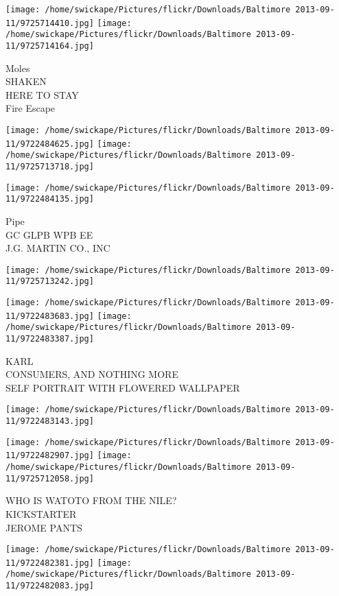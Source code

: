\documentclass[10pt,letterpaper]{article}
\begin{document}
\texttt{[image: /home/swickape/Pictures/flickr/Downloads/Baltimore 2013-09-11/9725714410.jpg]}
\texttt{[image: /home/swickape/Pictures/flickr/Downloads/Baltimore 2013-09-11/9725714164.jpg]}

Moles\\
SHAKEN\\
HERE TO STAY\\
Fire Escape
\pagebreak

\texttt{[image: /home/swickape/Pictures/flickr/Downloads/Baltimore 2013-09-11/9722484625.jpg]}
\texttt{[image: /home/swickape/Pictures/flickr/Downloads/Baltimore 2013-09-11/9725713718.jpg]}

\vspace{0.25in}
\texttt{[image: /home/swickape/Pictures/flickr/Downloads/Baltimore 2013-09-11/9722484135.jpg]}

Pipe\\
GC GLPB WPB EE\\
J.G. MARTIN CO., INC
\pagebreak

\texttt{[image: /home/swickape/Pictures/flickr/Downloads/Baltimore 2013-09-11/9725713242.jpg]}

\vspace{0.25in}
\texttt{[image: /home/swickape/Pictures/flickr/Downloads/Baltimore 2013-09-11/9722483683.jpg]}
\texttt{[image: /home/swickape/Pictures/flickr/Downloads/Baltimore 2013-09-11/9722483387.jpg]}

KARL\\
CONSUMERS, AND NOTHING MORE\\
SELF PORTRAIT WITH FLOWERED WALLPAPER
\pagebreak

\texttt{[image: /home/swickape/Pictures/flickr/Downloads/Baltimore 2013-09-11/9722483143.jpg]}

\vspace{0.25in}
\texttt{[image: /home/swickape/Pictures/flickr/Downloads/Baltimore 2013-09-11/9722482907.jpg]}
\texttt{[image: /home/swickape/Pictures/flickr/Downloads/Baltimore 2013-09-11/9725712058.jpg]}

WHO IS WATOTO FROM THE NILE?\\
KICKSTARTER\\
JEROME PANTS
\pagebreak

\texttt{[image: /home/swickape/Pictures/flickr/Downloads/Baltimore 2013-09-11/9722482381.jpg]}
\texttt{[image: /home/swickape/Pictures/flickr/Downloads/Baltimore 2013-09-11/9722482083.jpg]}
\end{document}
